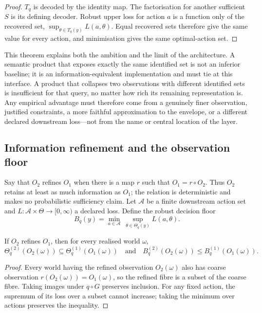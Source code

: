 \begin{proof}
$T_q$ is decoded by the identity map. The factorisation for another sufficient
$S$ is its defining decoder. Robust upper loss for action $a$ is a function
only of the recovered set,
$\sup_{\theta\in T_q(y)}L(a,\theta)$. Equal recovered sets therefore give the
same value for every action, and minimisation gives the same optimal-action
set.
\end{proof}

This theorem explains both the ambition and the limit of the architecture. A
semantic product that exposes exactly the same identified set is not an
inferior baseline; it is an information-equivalent implementation and must
tie at this interface. A product that collapses two observations with
different identified sets is insufficient for that query, no matter how rich
its remaining representation is. Any empirical advantage must therefore come
from a genuinely finer observation, justified constraints, a more faithful
approximation to the envelope, or a different declared downstream loss---not
from the name or central location of the layer.

\subsection{Information refinement and the observation floor}

Say that $O_2$ refines $O_1$ when there is a map $r$ such that
$O_1=r\circ O_2$. Thus $O_2$ retains at least as much information as $O_1$;
the relation is deterministic and makes no probabilistic sufficiency claim.
Let $\mathcal A$ be a finite downstream action set and
$L:\mathcal A\times\Theta\to[0,\infty)$ a declared loss. Define the robust
decision floor
\begin{equation}
  B_q(y)=\min_{a\in\mathcal A}\ \sup_{\theta\in\Theta_q(y)}L(a,\theta).
  \label{eq:decision-floor}
\end{equation}

\begin{theorem}
\label{thm:refinement}
If $O_2$ refines $O_1$, then for every realised world $\omega$,
\begin{equation}
 \Theta^{(2)}_q(O_2(\omega))
 \subseteq
 \Theta^{(1)}_q(O_1(\omega))
 \quad\text{and}\quad
 B^{(2)}_q(O_2(\omega))\leq B^{(1)}_q(O_1(\omega)).
\end{equation}
\end{theorem}

\begin{proof}
Every world having the refined observation $O_2(\omega)$ also has coarse
observation $r(O_2(\omega))=O_1(\omega)$, so the refined fibre is a subset of
the coarse fibre. Taking images under $q\circ G$ preserves inclusion. For any
fixed action, the supremum of its loss over a subset cannot increase; taking
the minimum over actions preserves the inequality.
\end{proof}

